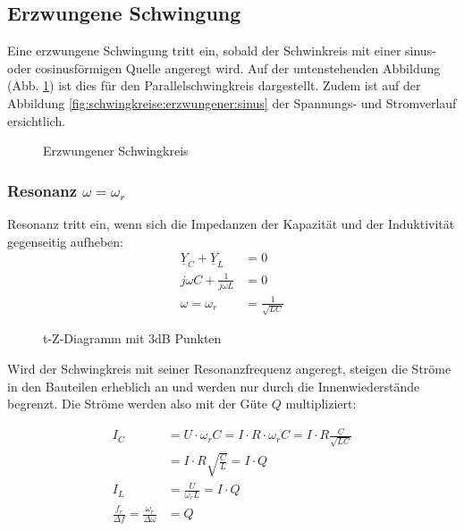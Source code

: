 \subsection{Erzwungene Schwingung}

Eine erzwungene Schwingung tritt ein, sobald der Schwinkreis mit einer sinus-
oder cosinusförmigen Quelle angeregt wird. Auf der untenstehenden Abbildung
(Abb. \ref{fig:schwingkreise:erzwungene}) ist dies für den Parallelschwingkreis
dargestellt. Zudem ist auf der Abbildung
\ref{fig:schwingkreise:erzwungener:sinus} der Spannungs- und Stromverlauf
ersichtlich.

\begin{figure}[!h]
\centering
{}
\qquad
{}
\caption{Erzwungener Schwingkreis}
\label{fig:schwingkreise:erzwungene}
\end{figure}


\subsubsection{Resonanz $\omega = \omega_r$}
Resonanz tritt ein, wenn sich die Impedanzen der Kapazität und der Induktivität
gegenseitig aufheben:
\begin{align}
	\underline{Y}_C +\underline{Y}_L &= 0\nonumber \\
	j\omega C+\frac{1}{j\omega L} &= 0\nonumber \\
	\omega=\omega_r &= \frac{1}{\sqrt{LC}}\nonumber
\end{align}

\begin{figure}[!h]
	\centering
	
	\caption{t-Z-Diagramm mit 3dB Punkten}
	\label{fig:tZDiagramm}
\end{figure}

Wird der Schwingkreis mit seiner Resonanzfrequenz angeregt, steigen die Ströme
in den Bauteilen erheblich an und werden nur durch die Innenwiederstände
begrenzt. Die Ströme werden also mit der Güte $Q$ multipliziert:

\begin{align}
	I_C&=U\cdot\omega_rC = I\cdot R \cdot \omega_rC = I\cdot R
	\frac{C}{\sqrt{LC}} \nonumber\\
	&=I\cdot R \sqrt{\frac{C}{L}} = I \cdot Q\nonumber\\
	I_L&=\frac{U}{\omega_rL}=I \cdot Q\nonumber\\
	\frac{f_r}{\Delta f}=\frac{\omega_r}{\Delta \omega} &= Q\nonumber
\end{align}

